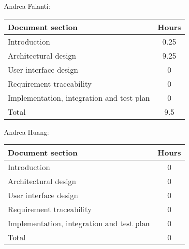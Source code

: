 Andrea Falanti:

\begin{tabular}{|l|c|}
    \hline
    Document section & Hours \\
    \hline
     Introduction & 0.25\\
     Architectural design & 9.25\\
     User interface design & 0\\
     Requirement traceability & 0\\
     Implementation, integration and test plan & 0\\
     \hline
     Total & 9.5\\
     \hline
\end{tabular}
\vskip 0.3in

Andrea Huang:

\begin{tabular}{|l|c|}
    \hline
    Document section & Hours \\
    \hline
     Introduction & 0\\
     Architectural design & 0\\
     User interface design & 0\\
     Requirement traceability & 0\\
     Implementation, integration and test plan & 0\\
     \hline
     Total & 0\\
     \hline
\end{tabular}